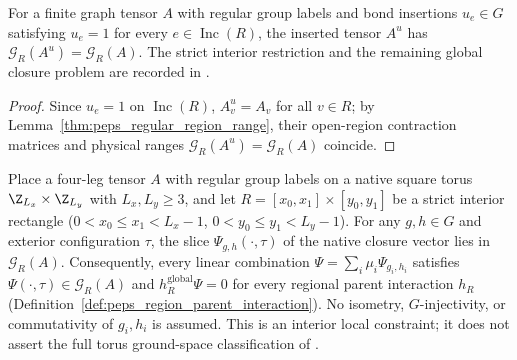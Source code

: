 \begin{lemma}%
    \label{lem:peps_regular_complementary_twists_region_space}
    \leanok
    For a finite graph tensor $A$ with regular group labels and bond insertions
    $u_e\in G$ satisfying $u_e=1$ for every $e\in\operatorname{Inc}(R)$, the
    inserted tensor $A^u$ has $\mathcal G_R(A^u)=\mathcal G_R(A)$.
    The strict interior restriction and the remaining global closure problem are recorded in
    \cite{gap:rmp_peps_quantum_double_g_isometry}.
\end{lemma}

\begin{proof}\leanok
    Since $u_e=1$ on $\operatorname{Inc}(R)$, $A_v^u=A_v$ for all $v\in R$; by
    Lemma~\ref{thm:peps_regular_region_range}, their open-region contraction
    matrices and physical ranges $\mathcal G_R(A^u)=\mathcal G_R(A)$ coincide.
\end{proof}

\begin{lemma}%
    \label{thm:peps_torus_closure_interior_parent_constraints}
    \leanok
    Place a four-leg tensor $A$ with regular group labels on a native square
    torus $\Z_{L_x}\times\Z_{L_y}$ with $L_x,L_y\ge 3$, and let
    $R=[x_0,x_1]\times[y_0,y_1]$ be a strict interior rectangle
    ($0<x_0\le x_1<L_x-1$, $0<y_0\le y_1<L_y-1$). For any $g,h\in G$ and
    exterior configuration $\tau$, the slice $\Psi_{g,h}(\cdot,\tau)$ of the
    native closure vector lies in $\mathcal G_R(A)$. Consequently, every
    linear combination $\Psi=\sum_i\mu_i\Psi_{g_i,h_i}$ satisfies
    $\Psi(\cdot,\tau)\in\mathcal G_R(A)$ and
    $h_R^{\mathrm{global}}\Psi=0$ for every regional parent interaction $h_R$
    (Definition~\ref{def:peps_region_parent_interaction}).
    No isometry, $G$-injectivity, or commutativity of $g_i,h_i$ is
    assumed. This is an interior local constraint; it does not assert
    the full torus ground-space classification of
    \cite[Theorem~5.5]{Schuch2010PEPS}.
\end{lemma}

